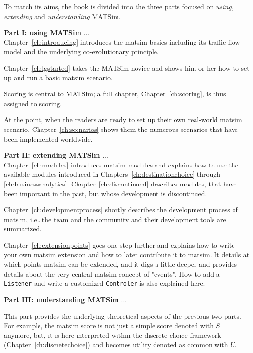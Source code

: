 To match its aims, the book is divided into the three parts focused on \emph{using, extending} and \emph{understanding} MATSim. 

\textbf{Part I: using MATSim} ... \\
Chapter~\ref{ch:introducing} introduces the \gls{matsim} basics including its traffic flow model and the underlying co-evolutionary principle. 

Chapter~\ref{ch:lgstarted} takes the MATSim novice and shows him or her how to set up and run a basic \gls{matsim} \gls{scenario}. 

Scoring is central to MATSim; a full chapter, Chapter~\ref{ch:scoring}, is thus assigned to scoring. 

At the point, when the readers are ready to set up their own real-world \gls{matsim} \gls{scenario}, Chapter~\ref{ch:scenarios} shows them the numerous scenarios that have been implemented worldwide. 

\textbf{Part II: extending MATSim} ... \\
Chapter~\ref{ch:modules} introduces \gls{matsim} \glspl{module} and explains how to use the available modules introduced in Chapters~\ref{ch:destinationchoice} through \ref{ch:businessanalytics}. Chapter~\ref{ch:discontinued} describes modules, that have been important in the past, but whose development is discontinued.

Chapter~\ref{ch:developmentprocess} shortly describes the development process of \gls{matsim}, i.e.,\,the team and the community and their development tools are summarized. 

Chapter~\ref{ch:extensionpoints} goes one step further and explains how to write your own \gls{matsim} \gls{extension} and how to later contribute it to \gls{matsim}. It details at which points \gls{matsim} can be extended, and it digs a little deeper and provides details about the very central \gls{matsim} concept of "events". How to add a \lstinline|Listener| and write a customized \lstinline|Controler| is also explained here.

\textbf{Part III: understanding MATSim} ... \\


This part provides the underlying theoretical aspects of the previous two parts. For example, the \gls{matsim} score is not just a simple score denoted with $S$ anymore, but, it is here interpreted within the discrete choice framework (Chapter~\ref{ch:discretechoice}) and becomes utility denoted as common with $U$. 

